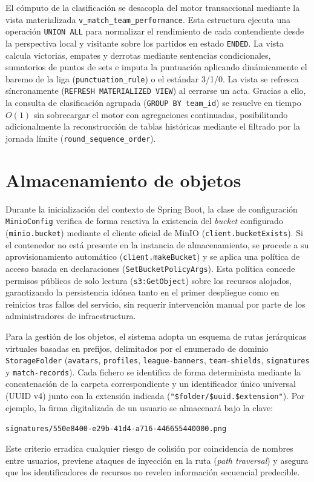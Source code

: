 El cómputo de la clasificación se desacopla del motor transaccional mediante la vista materializada \texttt{v\_match\_team\_performance}. Esta estructura ejecuta una operación \texttt{UNION ALL} para normalizar el rendimiento de cada contendiente desde la perspectiva local y visitante sobre los partidos en estado \texttt{ENDED}. La vista calcula victorias, empates y derrotas mediante sentencias condicionales, sumatorios de puntos de sets e imputa la puntuación aplicando dinámicamente el baremo de la liga (\texttt{punctuation\_rule}) o el estándar 3/1/0. La vista se refresca síncronamente (\texttt{REFRESH MATERIALIZED VIEW}) al cerrarse un acta. Gracias a ello, la consulta de clasificación agrupada (\texttt{GROUP BY team\_id}) se resuelve en tiempo $O(1)$ sin sobrecargar el motor con agregaciones continuadas, posibilitando adicionalmente la reconstrucción de tablas históricas mediante el filtrado por la jornada límite (\texttt{round\_sequence\_order}).


\section{Almacenamiento de objetos}
Durante la inicialización del contexto de Spring Boot, la clase de configuración \texttt{MinioConfig} verifica de forma reactiva la existencia del \emph{bucket} configurado (\texttt{minio.bucket}) mediante el cliente oficial de MinIO (\texttt{client.bucketExists}). Si el contenedor no está presente en la instancia de almacenamiento, se procede a su aprovisionamiento automático (\texttt{client.makeBucket}) y se aplica una política de acceso basada en declaraciones (\texttt{SetBucketPolicyArgs}). Esta política concede permisos públicos de solo lectura (\texttt{s3:GetObject}) sobre los recursos alojados, garantizando la persistencia idónea tanto en el primer despliegue como en reinicios tras fallos del servicio, sin requerir intervención manual por parte de los administradores de infraestructura.

Para la gestión de los objetos, el sistema adopta un esquema de rutas jerárquicas virtuales basadas en prefijos, delimitados por el enumerado de dominio \texttt{StorageFolder} (\texttt{avatars}, \texttt{profiles}, \texttt{league-banners}, \texttt{team-shields}, \texttt{signatures} y \texttt{match-records}). Cada fichero se identifica de forma determinista mediante la concatenación de la carpeta correspondiente y un identificador único universal (UUID v4) junto con la extensión indicada (\texttt{"\$folder/\$uuid.\$extension"}). Por ejemplo, la firma digitalizada de un usuario se almacenará bajo la clave:
\begin{center}
\texttt{signatures/550e8400-e29b-41d4-a716-446655440000.png}
\end{center}
Este criterio erradica cualquier riesgo de colisión por coincidencia de nombres entre usuarios, previene ataques de inyección en la ruta (\emph{path traversal}) y asegura que los identificadores de recursos no revelen información secuencial predecible.

